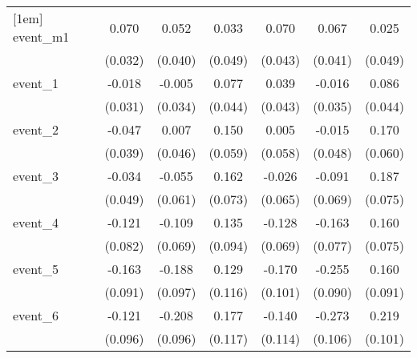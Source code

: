 {\begin{tabular}{l*{6}{c}}
[1em]
event\_m1    &       0.070\sym{*}  &       0.052         &       0.033         &       0.070         &       0.067         &       0.025         \\
            &     (0.032)         &     (0.040)         &     (0.049)         &     (0.043)         &     (0.041)         &     (0.049)         \\
[1em]
event\_1     &      -0.018         &      -0.005         &       0.077         &       0.039         &      -0.016         &       0.086         \\
            &     (0.031)         &     (0.034)         &     (0.044)         &     (0.043)         &     (0.035)         &     (0.044)         \\
[1em]
event\_2     &      -0.047         &       0.007         &       0.150\sym{*}  &       0.005         &      -0.015         &       0.170\sym{**} \\
            &     (0.039)         &     (0.046)         &     (0.059)         &     (0.058)         &     (0.048)         &     (0.060)         \\
[1em]
event\_3     &      -0.034         &      -0.055         &       0.162\sym{*}  &      -0.026         &      -0.091         &       0.187\sym{*}  \\
            &     (0.049)         &     (0.061)         &     (0.073)         &     (0.065)         &     (0.069)         &     (0.075)         \\
[1em]
event\_4     &      -0.121         &      -0.109         &       0.135         &      -0.128         &      -0.163\sym{*}  &       0.160\sym{*}  \\
            &     (0.082)         &     (0.069)         &     (0.094)         &     (0.069)         &     (0.077)         &     (0.075)         \\
[1em]
event\_5     &      -0.163         &      -0.188         &       0.129         &      -0.170         &      -0.255\sym{**} &       0.160         \\
            &     (0.091)         &     (0.097)         &     (0.116)         &     (0.101)         &     (0.090)         &     (0.091)         \\
[1em]
event\_6     &      -0.121         &      -0.208\sym{*}  &       0.177         &      -0.140         &      -0.273\sym{**} &       0.219\sym{*}  \\
            &     (0.096)         &     (0.096)         &     (0.117)         &     (0.114)         &     (0.106)         &     (0.101)         \\

\end{tabular}}

